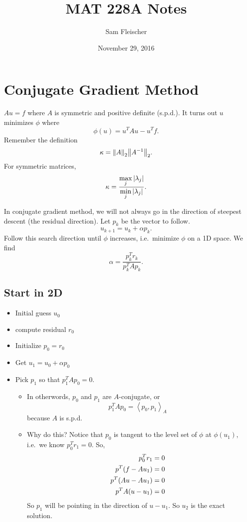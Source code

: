 \documentclass{article}
\title{MAT 228A Notes}
\author{Sam Fleischer}
\date{November 29, 2016}
\begin{document}
    \maketitle

    \section{Conjugate Gradient Method}
        $Au = f$ where $A$ is symmetric and positive definite (s.p.d.).  It turns out $u$ minimizes $\phi$ where $$\phi(u) = u^TAu - u^Tf.$$  Remember the definition $$\kappa = \norm{A}_2\norm{A^{-1}}_2.$$  For symmetric matrices, $$\kappa = \frac{\displaystyle\max_j\abs{\lambda_j}}{\displaystyle\min_j\abs{\lambda_j}}.$$

        In conjugate gradient method, we will not always go in the direction of steepest descent (the residual direction).  Let $p_k$ be the vector to follow.  $$u_{k+1} = u_k + \alpha p_k.$$  Follow this search direction until $\phi$ increases, i.e.~minimize $\phi$ on a 1D space.  We find $$\alpha = \frac{p_k^Tr_k}{p_k^TAp_k}.$$

        \subsection{Start in 2D}
            \begin{itemize}
                \item Initial guess $u_0$
                \item compute residual $r_0$
                \item Initialize $p_0 = r_0$
                \item Get $u_1 = u_0 + \alpha p_0$
                \item Pick $p_1$ so that $p_1^TAp_0 = 0$.
                \begin{itemize}
                    \item In otherwords, $p_0$ and $p_1$ are $A$-conjugate, or $$p_1^TAp_0 = \left\langle p_0, p_1 \right\rangle_A$$ because $A$ is s.p.d.
                    \item Why do this?  Notice that $p_0$ is tangent to the level set of $\phi$ at $\phi(u_1)$, i.e.~we know $p_0^Tr_1 = 0$.  So,
                    \begin{align*}
                        p_0^Tr_1 &= 0 \\
                        p^T\qty(f - Au_1) &= 0 \\
                        p^T\qty(Au - Au_1) &= 0 \\
                        p^TA\qty(u - u_1) &= 0
                    \end{align*}
                    So $p_1$ will be pointing in the direction of $u - u_1$.  So $u_2$ is the exact solution.
                \end{itemize}
            \end{itemize}
\end{document}
